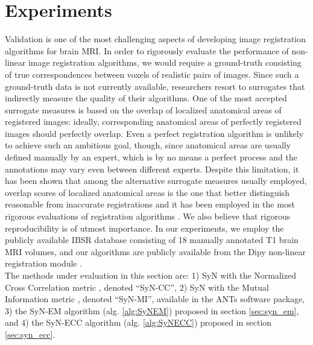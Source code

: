 \section{Experiments}
Validation is one of the most challenging aspects of developing image registration algorithms for brain MRI. In order to rigorously evaluate the performance of non-linear
image registration algorithms, we would require a ground-truth consisting of true correspondences between voxels of realistic pairs of images. Since such a ground-truth data is
not currently available, researchers resort to surrogates that indirectly measure the quality of their algorithms. One of the most accepted surrogate measures is based
on the overlap of localized anatomical areas of registered images: ideally, corresponding anatomical areas of perfectly registered images should perfectly
overlap. Even a perfect registration algorithm is unlikely to achieve such an ambitious goal, though, since anatomical areas are usually defined manually by an expert, which is
by no means a perfect process and the annotations may vary even between different experts. Despite this limitation, it has been shown that among the alternative surrogate measures
usually employed, overlap scores of localized anatomical areas is the one that better distinguish reasonable from inaccurate registrations \cite{Rohlfing2012} and it has been employed
in the most rigorous evaluations of registration algorithms \cite{Klein2009}\cite{Klein2010}\cite{Rohlfing2012}. We also believe that rigorous reproducibility is of utmost importance. In our
experiments, we employ the publicly available IBSR database consisting of 18 manually annotated T1 brain MRI volumes, and our algorithms are publicly available from the Dipy
non-linear registration module \cite{Garyfallidis2014}.\\

The methods under evaluation in this section are: 1) SyN with the Normalized Cross Correlation metric \cite{Avants2008}, denoted ``SyN-CC'', 2) SyN with the Mutual Information metric \cite{Mattes2003}, denoted ``SyN-MI'', available in the ANTs software package, 3) the SyN-EM algorithm (alg. \ref{alg:SyNEM}) proposed in section \ref{sec:syn_em}, and
4) the SyN-ECC algorithm (alg. \ref{alg:SyNECC}) proposed in section \ref{sec:syn_ecc}.

